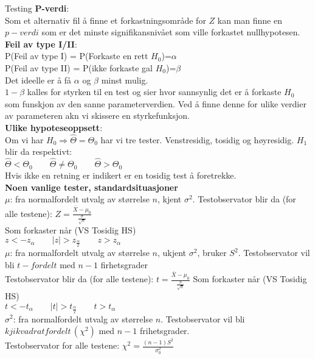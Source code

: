 \documentclass[final,hyperref={pdfpagelabels=false}]{beamer}
\begin{document}
\begin{frame}{}
\begin{columns}[t]
\begin{column}{.25\linewidth}
\begin{block}{\center\normalsize Testing}
{					\textbf{P-verdi}:\\
					Som et alternativ fil å finne et forkastningsområde for $Z$ kan man finne en $p-verdi$ som er det minste signifikansnivået som ville forkastet nullhypotesen.\\
					\textbf{Feil av type I/II}:\\
					P(Feil av type I) = P(Forkaste en rett $H_0$)=$\alpha$\\
					P(Feil av type II) = P(ikke forkaste gal $H_0$)=$\beta$\\
					Det ideelle er å få $\alpha$ og $\beta$ minst mulig.\\
					$1-\beta$ kalles for styrken til en test og sier hvor sannsynlig det er å forkaste $H_0$ som funskjon av den sanne parameterverdien. Ved å finne denne for ulike verdier av parameteren akn vi skissere en styrkefunksjon.\\
					\textbf{Ulike hypoteseoppsett}:\\
					Om vi har $H_0\Rightarrow \hat\Theta=\Theta_0$ har vi tre tester. Venstresidig, tosidig og høyresidig. $H_1$ blir da respektivt:\\
					$\hat\Theta<\Theta_0\qquad\hat\Theta\neq\Theta_0\qquad\hat\Theta>\Theta_0$\\
					Hvis ikke en retning er indikert er en tosidig test å foretrekke.\\
					\textbf{Noen vanlige tester, standardsituasjoner}\\
					$\mu$: fra normalfordelt utvalg av størrelse $n$, kjent $\sigma^2$. Testobservator blir da (for alle testene): $Z=\frac{\bar X - \mu_0}{\frac{\sigma}{\sqrt n}}$\\
					Som forkaster når (VS Tosidig HS)\\
					$z<-z_\alpha\qquad |z|>z_\frac{\alpha}{2}\qquad z>z_\alpha$\\
					$\mu$: fra normalfordelt utvalg av størrelse $n$, ukjent $\sigma^2$, bruker $S^2$. Testobservator vil bli $t-fordelt$ med $n-1$ firhetsgrader\\
					Testobservator blir da (for alle testene): $t=\frac{\bar X-\mu_0}{\frac{S}{\sqrt n}}$
					Som forkaster når (VS Tosidig HS)\\
					$t<-t_\alpha\qquad |t|>t_\frac{\alpha}{2}\qquad t>t_\alpha$\\
					$\sigma^2$: fra normalfordelt utvalg av størrelse $n$. Testobservator vil bli $kjikvadratfordelt\,(\chi^2)$ med $n-1$ frihetsgrader.\\
					Testobservator for alle testene: $\chi^2=\frac{(n-1)S^2}{\sigma_0^2}$\\
}
\end{block}
\end{column}
\end{columns}
\end{frame}
\end{document}
